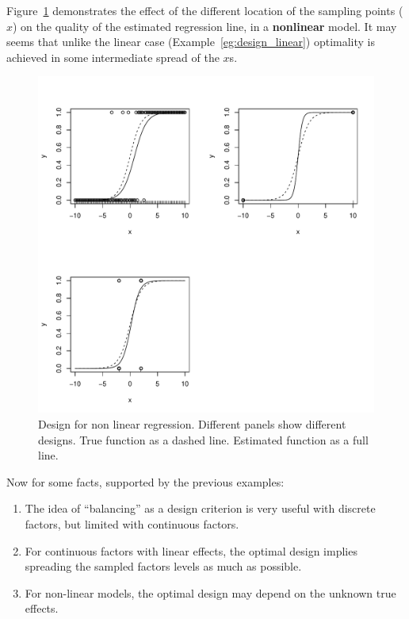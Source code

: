 \begin{example}
\label{eg:design_non_linear}
Figure~\ref{fig:design_nonlinear} demonstrates the effect of the different location of the sampling points ($x$) on the quality of the estimated regression line, in a \textbf{nonlinear} model.
It may seems that unlike the linear case (Example~\ref{eg:design_linear}) optimality is achieved in some intermediate spread of the $x$s.
\begin{figure}[h]
\centering
\includegraphics[height=0.3\textheight]{art/nonlinear}
\caption[Design for Non Linear Models]{Design for non linear regression. Different panels show different designs. True function as a dashed line. Estimated function as a full line.}
\label{fig:design_nonlinear}
\end{figure}
\end{example}





Now for some facts, supported by the previous examples:
\begin{enumerate}
\item The idea of ``balancing'' as a design criterion is very useful with discrete factors, but limited with continuous factors. 
\item For continuous factors with linear effects, the optimal design implies spreading the sampled factors levels as much as possible. 
\item For non-linear models, the optimal design may depend on the unknown true effects. 
\end{enumerate}



